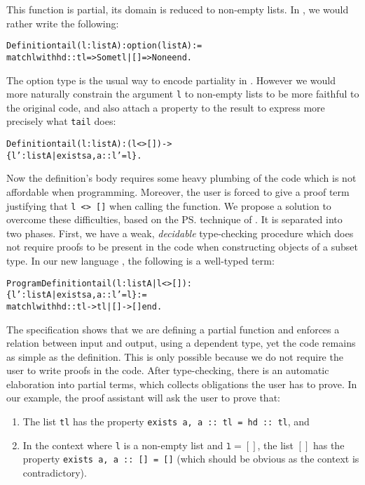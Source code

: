 \documentclass{llncs}
\newenvironment{code}{\begin{alltt}}{\end{alltt}}
\def\id#1{\texttt{#1}}
\begin{document}
This function is partial, its domain is reduced to non-empty lists. In
\Coq, we would rather write the following:
\begin{code}
  Definition tail (l : list A) : option (list A) :=
    match l with hd :: tl => Some tl | [] => None end.
\end{code}

The option type is the usual way to encode partiality in
\Coq. However we would more naturally constrain the argument \id{l} to
non-empty lists to be more faithful to the original \ML code, and also
attach a property to the result to express more precisely what \id{tail}
does:
\begin{code}
  Definition tail (l : list A) : (l <> []) -> 
  \{ l' : list A | exists a, a :: l' = l \}.
\end{code}
Now the definition's body requires some heavy plumbing of the code which is 
not affordable when programming. Moreover, the user is forced to give a
proof term justifying that \verb|l <> []| when calling the function.
We propose a solution to overcome these difficulties, based on the \ps{}
\cite{Shankar&Owre:WADT99} technique of \PVS{}
\cite{PVS-Semantics:TR}. It is separated into two phases. First, we have
a weak, \emph{decidable} type-checking
procedure which does not require proofs to be present in the code when
constructing objects of a subset type. In our new language \Russell, the
following is a well-typed term:
\begin{code}
  Program Definition tail ( l : list A | l <> [] ) : 
    \{ l' : list A | exists a, a :: l' = l \} := 
    match l with hd :: tl -> tl | [] -> [] end.
\end{code}

The specification shows that we are defining a partial function and
enforces a relation between input and output, using a dependent type, yet the
code remains as simple as the \ML{} definition. This is only possible
because we do not require the user to write proofs in the code. After type-checking,
there is an automatic elaboration into partial \Coq terms, which collects
obligations the user has to prove. In our example,
the proof assistant will ask the user to prove that:
\begin{enumerate}
\item The list \verb|tl| has the property \verb|exists a, a :: tl = hd :: tl|,
  and
\item In the context where
  \id{l} is a non-empty list and $\texttt{l} = []$, the list $[]$ has the property
  \verb|exists a, a :: [] = []| (which should be obvious as the context is contradictory).
\end{enumerate}
\end{document}

